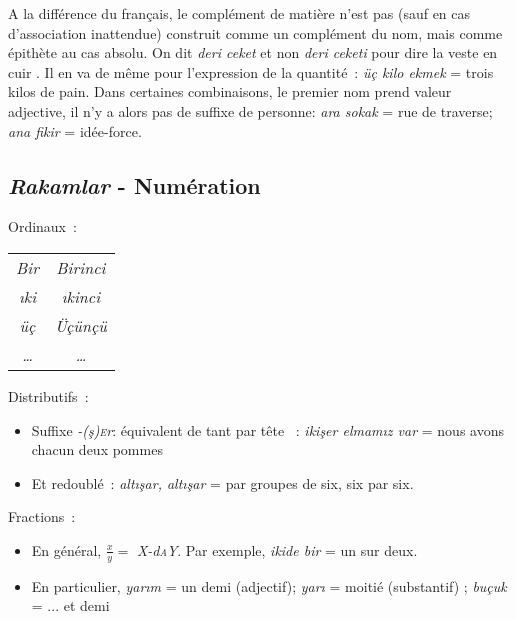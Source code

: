 \documentclass{cours}
\newcommand{\ch}{\c{s}}
\newcommand{\sca}{\textsc{a}}
\newcommand{\sce}{\textsc{e}}
\begin{document}
A la différence du français, le complément de matière n'est pas (sauf en cas d'association inattendue) construit comme un complément du nom, mais comme épithète au cas absolu. On dit \textsl{deri ceket} et non \textsl{deri ceketi} pour dire \og la veste en cuir \fg. Il en va de même pour l'expression de la quantité~: \textsl{üç kilo ekmek} = trois kilos de pain. Dans certaines combinaisons, le premier nom prend valeur adjective, il n'y a alors pas de suffixe de personne: \textsl{ara sokak} = rue de traverse; \textsl{ana fikir} = idée-force.

\subsection{\textsl{Rakamlar} - Numération}
Ordinaux~:
\begin{center}
    \begin{tabular}{>{\sl}c@{$\longrightarrow$}>{\sl}c}
        Bir   & Birinci  \\
        \i ki & \i kinci \\
        üç    & Üçünçü   \\
        \dots & \dots
    \end{tabular}
\end{center}
Distributifs~:
\begin{center}
    \begin{itemize}
        \item Suffixe \textsl{-(\ch)\sce r}: équivalent de \og tant par tête \fg\ : \textsl{iki\ch er elmam\i z var} = nous avons chacun deux pommes
        \item Et redoublé~: \textsl{alt\i \ch ar, alt\i \ch ar} = par groupes de six, six par six.
    \end{itemize}
\end{center}
Fractions~:
\begin{center}
    \begin{itemize}
        \item En général, $\frac{x}{y} = $ \textsl{X-d\sca Y}. Par exemple, \textsl{ikide bir} = un sur deux.
        \item En particulier, \textsl{yar\i m} = un demi (adjectif); \textsl{yar\i} = moitié (substantif) ; \textsl{buçuk} = ... et demi
    \end{itemize}
\end{center}
\end{document}
